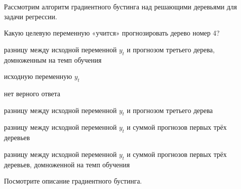 
\begin{question}
Рассмотрим алгоритм градиентного бустинга над решающими деревьями для задачи регрессии.

Какую целевую переменную «учится» прогнозировать дерево номер 4?
\begin{answerlist}
  \item разницу между исходной переменной \(y_t\) и прогнозом третьего дерева, домноженным на темп обучения
  \item исходную переменную \(y_t\)
  \item нет верного ответа
  \item разницу между исходной переменной \(y_t\) и прогнозом третьего дерева
  \item разницу между исходной переменной \(y_t\) и суммой прогнозов первых трёх деревьев
  \item разницу между исходной переменной \(y_t\) и суммой прогнозов первых трёх деревьев, домноженной на темп обучения
\end{answerlist}
\end{question}

\begin{solution}
Посмотрите описание градиентного бустинга.
\end{solution}

